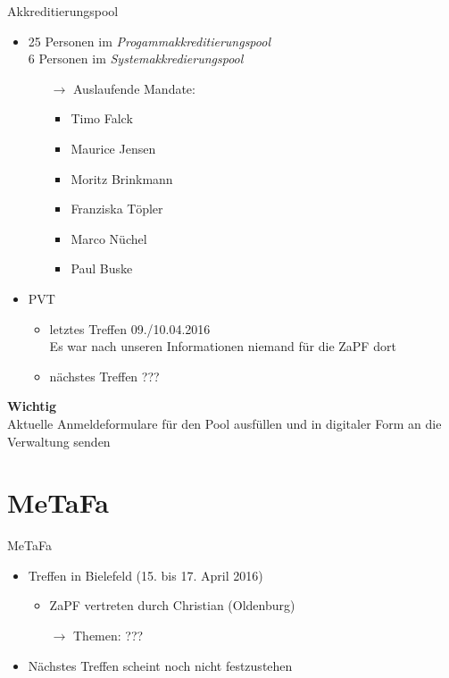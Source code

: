 \documentclass[compress,]{beamer}
\begin{document}
\begin{frame}{Akkreditierungspool}
	\begin{itemize}
		\item 25 Personen im \emph{Progammakkreditierungspool}\\
			6 Personen im \emph{Systemakkredierungspool}
			\begin{itemize}
				\item[$\rightarrow$] Auslaufende Mandate:
					\begin{itemize}
						\item Timo Falck
						\item Maurice Jensen
						\item Moritz Brinkmann
						\item Franziska Töpler
						\item Marco Nüchel
						\item Paul Buske
					\end{itemize}
			\end{itemize}
		\item PVT
			\begin{itemize}
				\item letztes Treffen 09./10.04.2016 \\
					Es war nach unseren Informationen niemand für die ZaPF dort
				\item nächstes Treffen ???
			\end{itemize}
	\end{itemize}
\end{frame}

\begin{frame}
	\begin{framed}
		\begin{center}
			{\Huge \textbf{Wichtig}}\\
			\vspace{0.5cm}
			{\Large Aktuelle Anmeldeformulare für den Pool ausfüllen und in digitaler Form an die Verwaltung senden}
		\end{center}
	\end{framed}
\end{frame}

\section{MeTaFa}

\begin{frame}{MeTaFa}
	\begin{itemize}
		\item Treffen in Bielefeld (15. bis 17. April 2016)
			\begin{itemize}
				\item ZaPF vertreten durch Christian (Oldenburg)
				\item[$\rightarrow$] Themen: ???
			\end{itemize}
		\item Nächstes Treffen scheint noch nicht festzustehen
	\end{itemize}
\end{frame}
\end{document}
